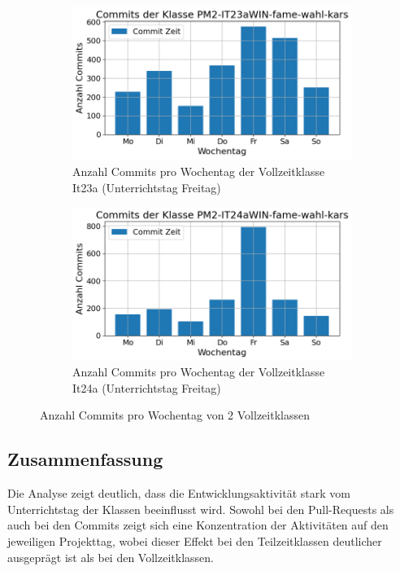 \begin{figure}[htbp]
    \centering
    \begin{subfigure}[b]{0.48\textwidth}
        \centering
        \includegraphics[width=\textwidth]{Figures/commits-klasse-per-wochentag-23a.png}
         \caption{Anzahl Commits pro Wochentag der Vollzeitklasse It23a (Unterrichtstag Freitag)}
        \label{fig:anzahl-commits-pro-wochentag-it23a}
    \end{subfigure}
    \hfill
    \begin{subfigure}[b]{0.48\textwidth}
        \centering
        \includegraphics[width=\textwidth]{Figures/commits-klasse-per-wochentag-24a.png}
         \caption{Anzahl Commits pro Wochentag der Vollzeitklasse It24a (Unterrichtstag Freitag)}
        \label{fig:anzahl-commits-pro-wochentag-it24a}
    \end{subfigure}
    \caption{Anzahl Commits pro Wochentag von 2 Vollzeitklassen}
    \label{fig:anz-commits-vollzeit-pro-wochentag}
\end{figure}

\newpage
\subsection{Zusammenfassung}
Die Analyse zeigt deutlich, dass die Entwicklungsaktivität stark vom Unterrichtstag der Klassen beeinflusst wird. Sowohl bei den Pull-Requests als auch bei den Commits zeigt sich eine Konzentration der Aktivitäten auf den jeweiligen Projekttag, wobei dieser Effekt bei den Teilzeitklassen deutlicher ausgeprägt ist als bei den Vollzeitklassen.

